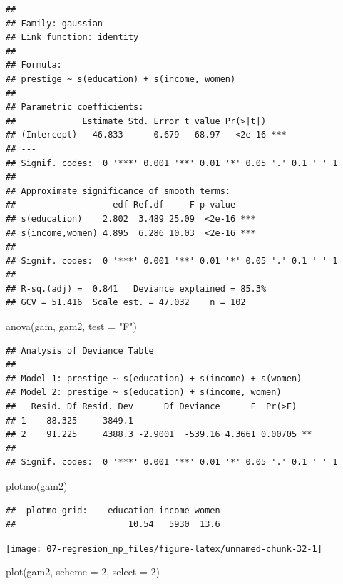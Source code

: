 \documentclass[
  spanish,
]{book}
\newenvironment{Shaded}{\begin{snugshade}}{\end{snugshade}}
\newcommand{\AttributeTok}[1]{\textcolor[rgb]{0.77,0.63,0.00}{#1}}
\newcommand{\DecValTok}[1]{\textcolor[rgb]{0.00,0.00,0.81}{#1}}
\newcommand{\FunctionTok}[1]{\textcolor[rgb]{0.00,0.00,0.00}{#1}}
\newcommand{\NormalTok}[1]{#1}
\newcommand{\StringTok}[1]{\textcolor[rgb]{0.31,0.60,0.02}{#1}}
\theoremstyle{break}
\theoremstyle{definition}
\theoremstyle{definition}
\theoremstyle{definition}
\theoremstyle{definition}
\theoremstyle{remark}
\begin{document}
\begin{verbatim}
## 
## Family: gaussian 
## Link function: identity 
## 
## Formula:
## prestige ~ s(education) + s(income, women)
## 
## Parametric coefficients:
##             Estimate Std. Error t value Pr(>|t|)    
## (Intercept)   46.833      0.679   68.97   <2e-16 ***
## ---
## Signif. codes:  0 '***' 0.001 '**' 0.01 '*' 0.05 '.' 0.1 ' ' 1
## 
## Approximate significance of smooth terms:
##                   edf Ref.df     F p-value    
## s(education)    2.802  3.489 25.09  <2e-16 ***
## s(income,women) 4.895  6.286 10.03  <2e-16 ***
## ---
## Signif. codes:  0 '***' 0.001 '**' 0.01 '*' 0.05 '.' 0.1 ' ' 1
## 
## R-sq.(adj) =  0.841   Deviance explained = 85.3%
## GCV = 51.416  Scale est. = 47.032    n = 102
\end{verbatim}

\begin{Shaded}
\begin{Highlighting}[]
\FunctionTok{anova}\NormalTok{(gam, gam2, }\AttributeTok{test =} \StringTok{"F"}\NormalTok{)}
\end{Highlighting}
\end{Shaded}

\begin{verbatim}
## Analysis of Deviance Table
## 
## Model 1: prestige ~ s(education) + s(income) + s(women)
## Model 2: prestige ~ s(education) + s(income, women)
##   Resid. Df Resid. Dev      Df Deviance      F  Pr(>F)   
## 1    88.325     3849.1                                   
## 2    91.225     4388.3 -2.9001  -539.16 4.3661 0.00705 **
## ---
## Signif. codes:  0 '***' 0.001 '**' 0.01 '*' 0.05 '.' 0.1 ' ' 1
\end{verbatim}

\begin{Shaded}
\begin{Highlighting}[]
\FunctionTok{plotmo}\NormalTok{(gam2)}
\end{Highlighting}
\end{Shaded}

\begin{verbatim}
##  plotmo grid:    education income women
##                      10.54   5930  13.6
\end{verbatim}

\begin{center}\texttt{[image: 07-regresion\_np\_files/figure-latex/unnamed-chunk-32-1]} \end{center}

\begin{Shaded}
\begin{Highlighting}[]
\FunctionTok{plot}\NormalTok{(gam2, }\AttributeTok{scheme =} \DecValTok{2}\NormalTok{, }\AttributeTok{select =} \DecValTok{2}\NormalTok{)}
\end{Highlighting}
\end{Shaded}
\end{document}
